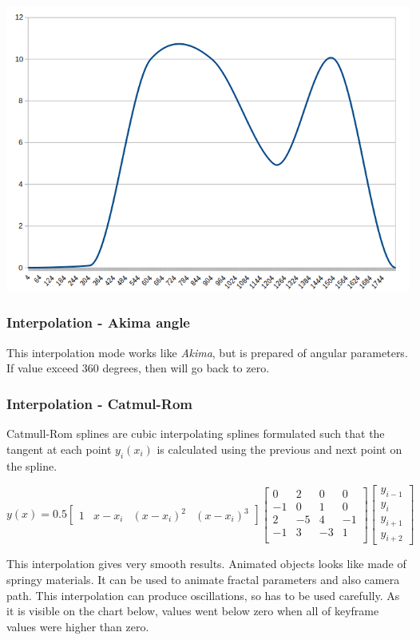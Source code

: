 \includegraphics[width=0.5\linewidth]{img/manual/media/interpolation_akima.png}

\subsubsection{Interpolation - Akima angle}\label{interpolation-akima-angle}

This interpolation mode works like \emph{Akima}, but is prepared of angular
parameters. If value exceed 360 degrees, then will go back to zero.

\subsubsection{Interpolation - Catmul-Rom}\label{interpolation-catmul-rom}

Catmull-Rom splines are cubic interpolating splines formulated such that the
tangent at each point $ y_i(x_i) $ is calculated using the previous and next
point on the spline.

\[ y(x) = 0.5 \begin{bmatrix} 1 & x-x_i & (x-x_i)^2 & (x-x_i)^3\end{bmatrix}
\begin{bmatrix} 0 & 2 & 0 & 0 \\ -1 & 0 & 1 & 0 \\ 2 & -5 & 4 & -1 \\ -1 & 3 &
-3 & 1 \\ \end{bmatrix} \begin{bmatrix} y_{i-1} \\ y_i \\ y_{i+1} \\ y_{i+2}
\end{bmatrix} \]

This interpolation gives very smooth results. Animated objects looks like made
of springy materials. It can be used to animate fractal parameters and also
camera path. This interpolation can produce oscillations, so has to be used
carefully. As it is visible on the chart below, values went below zero when all
of keyframe values were higher than zero.

